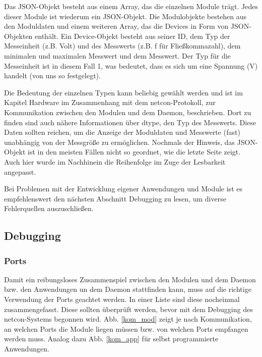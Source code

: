 \documentclass[a4paper,14pt,headsepline]{scrartcl}
\begin{document}
\newpage

Das JSON-Objekt besteht aus einem Array, das die einzelnen Module trägt. Jedes dieser Module ist wiederum ein JSON-Objekt. Die Modulobjekte bestehen aus den Moduldaten und einem weiteren Array, das die Devices in Form von JSON-Objekten enthält. Ein Device-Objekt besteht aus seiner ID, dem Typ der Messeinheit (z.B. Volt) und des Messwerts (z.B. f für Fließkommazahl), dem minimalen und maximalen Messwert und dem Messwert. Der Typ für die Messeinheit ist in diesem Fall 1, was bedeutet, dass es sich um eine Spannung (V) handelt (von uns so festgelegt). 

Die Bedeutung der einzelnen Typen kann beliebig gewählt werden und ist im Kapitel Hardware im Zusammenhang mit dem netcon-Protokoll, zur Kommunikation zwischen den Modulen und dem Daemon, beschrieben. Dort zu finden sind auch nähere Informationen über dtype, den Typ des Messwerts. Diese Daten sollten reichen, um die Anzeige der Moduldaten und Messwerte (fast) unabhängig von der Messgröße zu ermöglichen. Nochmals der Hinweis, das JSON-Objekt ist in den meisten Fällen nicht so geordnet, wie die letzte Seite zeigt. Auch hier wurde im Nachhinein die Reihenfolge im Zuge der Lesbarkeit angepasst. 

Bei Problemen mit der Entwicklung eigener Anwendungen und Module ist es empfehlenswert den nächsten Abschnitt Debugging zu lesen, um diverse Fehlerquellen auszuschließen. 

\newpage

\subsection{Debugging}

\subsubsection{Ports}

Damit ein reibungsloses Zusammenspiel zwischen den Modulen und dem Daemon bzw. den Anwendungen un dem Daemon stattfinden kann, muss auf die richtige Verwendung der Ports geachtet werden. In einer Liste sind diese nocheinmal zusammengefasst. Diese sollten überprüft werden, bevor mit dem Debugging des netcon-Systems begonnen wird. Abb. \ref{kom_mod} zeigt je nach Kommunikation, an welchen Ports die Module liegen müssen bzw. von welchen Ports empfangen werden muss. Analog dazu Abb. \ref{kom_app} für selbst programmierte Anwendungen. 
\end{document}
